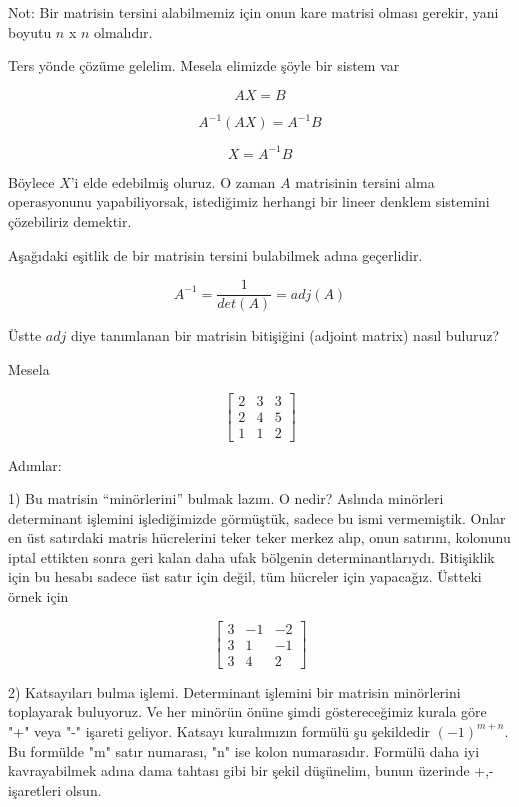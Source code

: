 \documentclass[12pt,fleqn]{article}\usepackage{../../common}
\begin{document}
Not: Bir matrisin tersini alabilmemiz için onun kare matrisi olması gerekir,
yani boyutu $n$ x $n$ olmalıdır. 

Ters yönde çözüme gelelim. Mesela elimizde şöyle bir sistem var

$$  AX = B$$

$$  A^{-1}(AX) = A^{-1}B$$

$$  X = A^{-1}B$$

Böylece $X$'i elde edebilmiş oluruz. O zaman $A$ matrisinin tersini alma
operasyonunu yapabiliyorsak, istediğimiz herhangi bir lineer denklem
sistemini çözebiliriz demektir. 

Aşağıdaki eşitlik de bir matrisin tersini bulabilmek adına geçerlidir. 

$$ A^{-1} = \frac{1}{det(A)}  = adj(A)$$

Üstte $adj$ diye tanımlanan bir matrisin bitişiğini (adjoint matrix) nasıl
buluruz?

Mesela

$$ 
\left[\begin{array}{rrr}
2 & 3 & 3 \\
2 & 4 & 5 \\
1 & 1 & 2
\end{array}\right]
 $$

Adımlar:

1) Bu matrisin ``minörlerini'' bulmak lazım. O nedir? Aslında minörleri
determinant işlemini işlediğimizde görmüştük, sadece bu ismi vermemiştik.
Onlar en üst satırdaki matris hücrelerini teker teker merkez alıp, onun
satırını, kolonunu iptal ettikten sonra geri kalan daha ufak bölgenin
determinantlarıydı. Bitişiklik için bu hesabı sadece üst satır için değil,
tüm hücreler için yapacağız. Üstteki örnek için

$$ 
\left[\begin{array}{rrr}
3 & -1 & -2 \\
3 & 1 & -1 \\
3 & 4 & 2
\end{array}\right]
 $$




2) Katsayıları bulma işlemi. Determinant işlemini bir matrisin minörlerini 
toplayarak buluyoruz. Ve her minörün önüne şimdi göstereceğimiz kurala göre "+" 
veya "-" işareti geliyor. Katsayı kuralımızın formülü şu şekildedir 
$(-1)^{m+n}$. Bu formülde "m" satır numarası, "n" ise kolon numarasıdır. Formülü 
daha iyi kavrayabilmek adına dama tahtası gibi bir şekil düşünelim, bunun
üzerinde +,- işaretleri olsun. 
\end{document}
